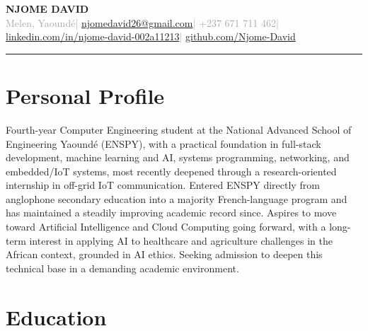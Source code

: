 \documentclass[10pt, a4paper]{article}
\begin{document}

{\LARGE\bfseries\color{navyblue} NJOME DAVID}\\[4pt]
{\small\textcolor{darkgray}{%
  Melen, Yaoundé\quad|\quad
  \href{mailto:njomedavid26@gmail.com}{njomedavid26@gmail.com}\quad|\quad
  +237 671 711 462\quad|\quad
  \href{https://www.linkedin.com/in/njome-david-002a11213}{linkedin.com/in/njome-david-002a11213}\quad|\quad
  \href{https://github.com/Njome-David}{github.com/Njome-David}
}}

\vspace{4pt}
\textcolor{navyblue}{\rule{\linewidth}{1.8pt}}
\vspace{2pt}

\section{Personal Profile}

Fourth-year Computer Engineering student at the National Advanced School of Engineering Yaoundé
(ENSPY), with a practical foundation in full-stack development, machine learning and AI, systems programming, networking,
and embedded/IoT systems, most recently deepened through a research-oriented
internship in off-grid IoT communication. Entered ENSPY directly from anglophone secondary
education into a majority French-language program and has maintained a steadily improving
academic record since. Aspires to move toward Artificial Intelligence and Cloud Computing going
forward, with a long-term interest in applying AI to healthcare and agriculture challenges in the
African context, grounded in AI ethics. Seeking admission to deepen this technical base in a
demanding academic environment.

\section{Education}
\end{document}
